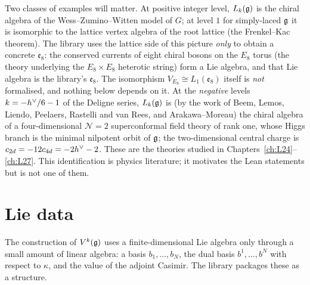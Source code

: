 Two classes of examples will matter. At positive integer level, $L_k(\mathfrak g)$ is the chiral algebra of the
Wess--Zumino--Witten model of $G$; at level $1$ for simply-laced $\mathfrak g$ it is isomorphic to the lattice vertex algebra
of the root lattice (the Frenkel--Kac theorem). The library uses the lattice side of this picture \emph{only} to obtain
a concrete $\mathfrak e_8$: the conserved currents of eight chiral bosons on the $E_8$ torus (the theory underlying the
$E_8\times E_8$ heterotic string) form a Lie algebra, and that Lie algebra is the library's $\mathfrak e_8$. The
isomorphism $V_{E_8}\cong L_1(\mathfrak e_8)$ itself is \emph{not} formalised, and nothing below depends on it. At
the \emph{negative} levels $k=-h^\vee/6-1$ of the Deligne series, $L_k(\mathfrak g)$ is (by the work of Beem,
Lemos, Liendo, Peelaers, Rastelli and van Rees, and Arakawa--Moreau) the chiral algebra of a four-dimensional
$\mathcal N=2$ superconformal field theory of rank one, whose Higgs branch is the minimal nilpotent orbit of
$\mathfrak g$; the two-dimensional central charge is $c_{2d}=-12c_{4d}=-2h^\vee-2$. These are the theories studied in
Chapters~\ref{ch:L24}--\ref{ch:L27}. This identification is physics literature; it motivates the Lean statements but is
not one of them.

\section{Lie data}\label{l23:sec:liedata}

The construction of $V^k(\mathfrak g)$ uses a finite-dimensional Lie algebra only through a small amount of linear algebra:
a basis $b_1,\dots,b_N$, the dual basis $b^1,\dots,b^N$ with respect to $\kappa$, and the value of the adjoint
Casimir. The library packages these as a structure.


